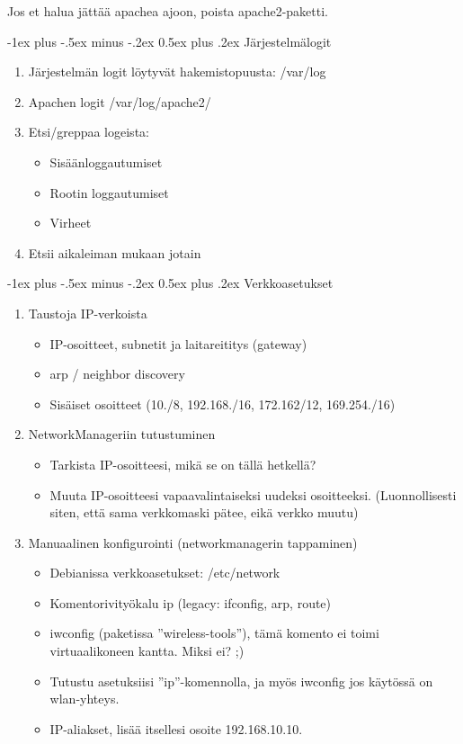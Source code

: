 \documentclass[12pt,portrait,a4]{article}
\makeatletter
\renewcommand{\section}{\@startsection{section}{1}{0mm}%
                                {-1ex plus -.5ex minus -.2ex}%
                                {0.5ex plus .2ex}%
                                {\normalfont\large\bfseries}}
\makeatother
\begin{document}
Jos et halua jättää apachea ajoon, poista apache2-paketti.

\section{Järjestelmälogit}

\begin{enumerate}
\item Järjestelmän logit löytyvät hakemistopuusta: /var/log
\item Apachen logit /var/log/apache2/
\item Etsi/greppaa logeista:
	\begin{itemize}
	\item Sisäänloggautumiset
	\item Rootin loggautumiset
	\item Virheet
	\end{itemize}
\item Etsii aikaleiman mukaan jotain
\end{enumerate}

\section{Verkkoasetukset}

\begin{enumerate}
\item Taustoja IP-verkoista
	\begin{itemize}
	\item IP-osoitteet, subnetit ja laitareititys (gateway)
	\item arp / neighbor discovery
	\item Sisäiset osoitteet (10./8, 192.168./16, 172.162/12, 169.254./16)
	\end{itemize}
\item NetworkManageriin tutustuminen
	\begin{itemize}
	\item Tarkista IP-osoitteesi, mikä se on tällä hetkellä?
	\item Muuta IP-osoitteesi vapaavalintaiseksi uudeksi osoitteeksi. (Luonnollisesti siten, että sama verkkomaski pätee, eikä verkko muutu)
	\end{itemize}
\item Manuaalinen konfigurointi (networkmanagerin tappaminen)
	\begin{itemize}
	\item Debianissa verkkoasetukset: /etc/network
	\item Komentorivityökalu ip (legacy: ifconfig, arp, route)
	\item iwconfig (paketissa ''wireless-tools''), tämä komento ei toimi virtuaalikoneen kantta. Miksi ei? ;)
	\item Tutustu asetuksiisi ''ip''-komennolla, ja myös iwconfig jos
	käytössä on wlan-yhteys.
	\item IP-aliakset, lisää itsellesi osoite 192.168.10.10.
	\end{itemize}
\end{enumerate}
\end{document}
